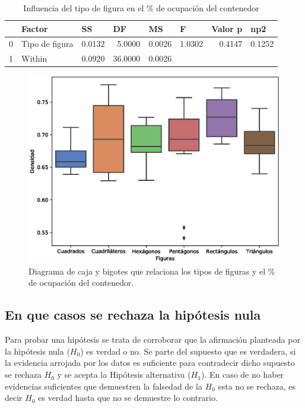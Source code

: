 \documentclass{article}
\begin{document}
\begin{table}
  \centering
  \caption{Influencia del tipo de figura en el \% de ocupación del contenedor}
 
    \begin{tabular}{clrrrrrr}
    \toprule
          & \textbf{Factor} & \multicolumn{1}{l}{\textbf{SS}} & \multicolumn{1}{l}{\textbf{DF}} & \multicolumn{1}{l}{\textbf{MS}} & \multicolumn{1}{l}{\textbf{F}} & \multicolumn{1}{l}{\textbf{Valor p}} & \multicolumn{1}{l}{\textbf{np2}} \\
    \midrule
    0     & Tipo de figura & 0.0132 & 5.0000     & 0.0026 & 1.0302 & 0.4147 & 0.1252 \\
    1     & Within & 0.0920 & 36.0000    & 0.0026 &       &       &  \\
    \bottomrule
    \end{tabular}%

    \label{tab:1}
\end{table}
    
 \begin{figure}
    \centering
    \includegraphics[scale=0.8]{figuras/boxplot_Figuras.eps}
    \caption{Diagrama de caja y bigotes que relaciona los tipos de figuras y el \% de ocupación del contenedor.}
    \label{fig:1}
\end{figure}


\subsection{En que casos se rechaza la hipótesis nula}
\label{sec:2}
Para probar una hipótesis se trata de corroborar que la afirmación planteada por la hipótesis nula ($H_{0}$) es verdad o no. Se parte del supuesto que  es verdadera, si la evidencia arrojada por los datos es suficiente para contradecir dicho supuesto se rechaza $H_{0}$ y se acepta la Hipótesis alternativa ($H_{1}$). En caso de no haber evidencias suficientes que demuestren la falsedad de la $H_{0}$ esta no se rechaza, es decir $H_{0}$ es verdad hasta que no se demuestre lo contrario.
\end{document}
